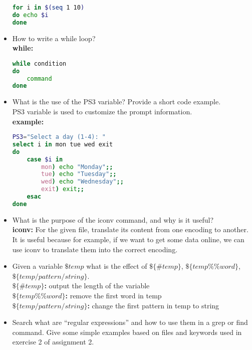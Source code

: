 \documentclass{article}
\begin{document}
\begin{itemize}
\begin{lstlisting}[language=bash]
for i in $(seq 1 10)
do echo $i
done
\end{lstlisting}
\item How to write a while loop?\\
\textbf{while:}
\begin{lstlisting}[language=bash]
while condition
do
    command
done
\end{lstlisting}
\item What is the use of the PS3 variable? Provide a short code example.\\
PS3 variable is used to customize the prompt information.\\
\textbf{example:}
\begin{lstlisting}[language=bash]
PS3="Select a day (1-4): "
select i in mon tue wed exit
do
    case $i in
        mon) echo "Monday";;
        tue) echo "Tuesday";;
        wed) echo "Wednesday";;
        exit) exit;;
    esac
done
\end{lstlisting}
\item What is the purpose of the iconv command, and why is it useful?\\
\textbf{iconv:} For the given file, translate its content from one encoding to another. \\
It is useful because for example, if we want to get some data online, we can use iconv to translate them into the correct encoding.\\
\item Given a variable $\$temp$ what is the effect of $\$\{\#temp\}$, $\$\{temp\%\%word\}$, $\$\{temp/pattern/string\}$.\\
\textbf{$\$\{\#temp\}$:} output the length of the variable\\
\textbf{$\$\{temp\%\%word\}$:} remove the first word in temp\\
\textbf{$\$\{temp/pattern/string\}$:} change the first pattern in temp to string

\item Search what are “regular expressions” and how to use them in a grep or find command. Give some simple examples based on files and keywords used in exercise 2 of assignment 2.\\


\end{itemize}
\end{document}
